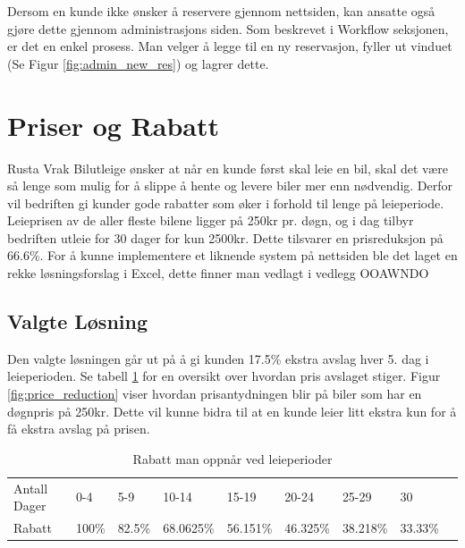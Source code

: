 %
\vspace{-7cm}
%
\begin{flushleft}
\begin{minipage}{0.5\textwidth}

%
%
Dersom en kunde ikke ønsker å reservere gjennom nettsiden, kan ansatte også gjøre dette gjennom administrasjons siden. Som beskrevet i Workflow seksjonen, er det en enkel prosess. Man velger å legge til en ny reservasjon, fyller ut vinduet (Se Figur \ref{fig:admin_new_res}) og lagrer dette.

\end{minipage}
\end{flushleft}

\newpage
\section{Priser og Rabatt}
Rusta Vrak Bilutleige ønsker at når en kunde først skal leie en bil, skal det være så lenge som mulig for å slippe å hente og levere biler mer enn nødvendig. Derfor vil bedriften gi kunder gode rabatter som øker i forhold til lenge på leieperiode. Leieprisen av de aller fleste bilene ligger på 250kr pr. døgn, og i dag tilbyr bedriften utleie for 30 dager for kun 2500kr. Dette tilsvarer en prisreduksjon på 66.6\%. For å kunne implementere et liknende system på nettsiden ble det laget en rekke løsningsforslag i Excel, dette finner man vedlagt i vedlegg OOAWNDO

\subsection*{Valgte Løsning}
Den valgte løsningen går ut på å gi kunden 17.5\% ekstra avslag hver 5. dag i leieperioden. Se tabell \ref{table:percent} for en oversikt over hvordan pris avslaget stiger. Figur \ref{fig:price_reduction} viser hvordan prisantydningen blir på biler som har en døgnpris på 250kr. Dette vil kunne bidra til at en kunde leier litt ekstra kun for å få ekstra avslag på prisen. 

\begin{table}[htbp]
\centering
\caption{Rabatt man oppnår ved leieperioder}
\label{table:percent}
\begin{tabular}{|l|l|l|l|l|l|l|l|l}
\cline{1-8}
Antall Dager & 0-4   & 5-9    & 10-14     & 15-19    & 20-24    & 25-29    & 30      &  \\ \cline{1-8}
Rabatt       & 100\% & 82.5\% & 68.0625\% & 56.151\% & 46.325\% & 38.218\% & 33.33\% &  \\ \cline{1-8}
\end{tabular}
\end{table}



